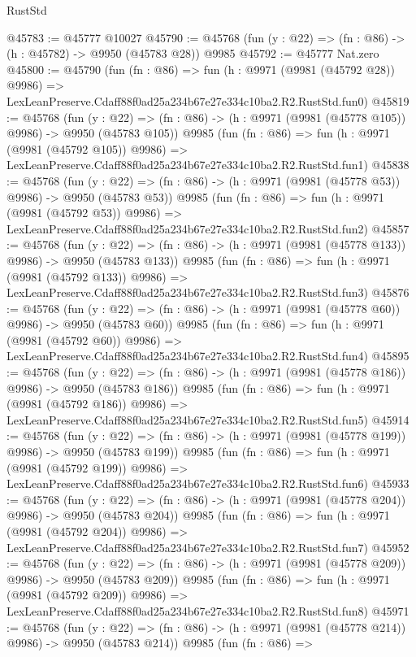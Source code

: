 \begin{lexlean}{RustStd}
\begin{coremodule}
@45783 := @45777 @10027
@45790 := @45768 (fun (y : @22) => (fn : @86) -> (h : @45782) -> @9950 (@45783 @28)) @9985
@45792 := @45777 Nat.zero
@45800 := @45790
    (fun (fn : @86) =>
    fun (h : @9971 (@9981 (@45792 @28)) @9986) =>
    LexLeanPreserve.Cdaff88f0ad25a234b67e27e334c10ba2.R2.RustStd.fun0)
@45819 := @45768
    (fun (y : @22) => (fn : @86) -> (h : @9971 (@9981 (@45778 @105)) @9986) -> @9950 (@45783 @105))
    @9985
    (fun (fn : @86) =>
    fun (h : @9971 (@9981 (@45792 @105)) @9986) =>
    LexLeanPreserve.Cdaff88f0ad25a234b67e27e334c10ba2.R2.RustStd.fun1)
@45838 := @45768
    (fun (y : @22) => (fn : @86) -> (h : @9971 (@9981 (@45778 @53)) @9986) -> @9950 (@45783 @53))
    @9985
    (fun (fn : @86) =>
    fun (h : @9971 (@9981 (@45792 @53)) @9986) =>
    LexLeanPreserve.Cdaff88f0ad25a234b67e27e334c10ba2.R2.RustStd.fun2)
@45857 := @45768
    (fun (y : @22) => (fn : @86) -> (h : @9971 (@9981 (@45778 @133)) @9986) -> @9950 (@45783 @133))
    @9985
    (fun (fn : @86) =>
    fun (h : @9971 (@9981 (@45792 @133)) @9986) =>
    LexLeanPreserve.Cdaff88f0ad25a234b67e27e334c10ba2.R2.RustStd.fun3)
@45876 := @45768
    (fun (y : @22) => (fn : @86) -> (h : @9971 (@9981 (@45778 @60)) @9986) -> @9950 (@45783 @60))
    @9985
    (fun (fn : @86) =>
    fun (h : @9971 (@9981 (@45792 @60)) @9986) =>
    LexLeanPreserve.Cdaff88f0ad25a234b67e27e334c10ba2.R2.RustStd.fun4)
@45895 := @45768
    (fun (y : @22) => (fn : @86) -> (h : @9971 (@9981 (@45778 @186)) @9986) -> @9950 (@45783 @186))
    @9985
    (fun (fn : @86) =>
    fun (h : @9971 (@9981 (@45792 @186)) @9986) =>
    LexLeanPreserve.Cdaff88f0ad25a234b67e27e334c10ba2.R2.RustStd.fun5)
@45914 := @45768
    (fun (y : @22) => (fn : @86) -> (h : @9971 (@9981 (@45778 @199)) @9986) -> @9950 (@45783 @199))
    @9985
    (fun (fn : @86) =>
    fun (h : @9971 (@9981 (@45792 @199)) @9986) =>
    LexLeanPreserve.Cdaff88f0ad25a234b67e27e334c10ba2.R2.RustStd.fun6)
@45933 := @45768
    (fun (y : @22) => (fn : @86) -> (h : @9971 (@9981 (@45778 @204)) @9986) -> @9950 (@45783 @204))
    @9985
    (fun (fn : @86) =>
    fun (h : @9971 (@9981 (@45792 @204)) @9986) =>
    LexLeanPreserve.Cdaff88f0ad25a234b67e27e334c10ba2.R2.RustStd.fun7)
@45952 := @45768
    (fun (y : @22) => (fn : @86) -> (h : @9971 (@9981 (@45778 @209)) @9986) -> @9950 (@45783 @209))
    @9985
    (fun (fn : @86) =>
    fun (h : @9971 (@9981 (@45792 @209)) @9986) =>
    LexLeanPreserve.Cdaff88f0ad25a234b67e27e334c10ba2.R2.RustStd.fun8)
@45971 := @45768
    (fun (y : @22) => (fn : @86) -> (h : @9971 (@9981 (@45778 @214)) @9986) -> @9950 (@45783 @214))
    @9985
    (fun (fn : @86) =>

\end{coremodule}
\end{lexlean}
